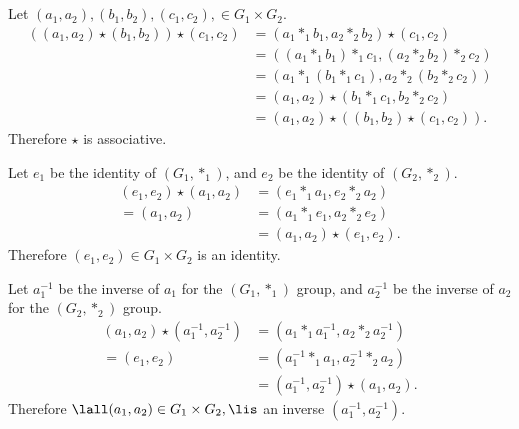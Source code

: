 \section{}
    \subsection{
        }

        Let $(a_1, a_2),(b_1, b_2),(c_1, c_2), \in G_1\times G_2$.
        \begin{align*}
            ((a_1, a_2) \star (b_1, b_2)) \star (c_1, c_2) 
            &= (a_1 *_1 b_1, a_2 *_2 b_2) \star (c_1, c_2) \\
            &= ((a_1 *_1 b_1) *_1 c_1, (a_2 *_2 b_2) *_2 c_2) \\
            &= (a_1 *_1 (b_1 *_1 c_1), a_2 *_2 (b_2 *_2 c_2)) \\
            &= (a_1, a_2) \star (b_1 *_1 c_1, b_2 *_2 c_2) \\
            &= (a_1, a_2) \star ((b_1, b_2) \star (c_1, c_2)).
        \end{align*}
        Therefore $\star$ is associative.

        Let $e_1$ be the identity of $(G_1, *_1)$,
        and $e_2$ be the identity of $(G_2, *_2)$.
        \begin{align*}
            (e_1, e_2) \star (a_1, a_2) 
            &= (e_1 *_1 a_1, e_2 *_2 a_2) \\
            = (a_1, a_2) 
            &= (a_1 *_1 e_1, a_2 *_2 e_2) \\
            &= (a_1, a_2) \star (e_1, e_2).
        \end{align*}
        Therefore $(e_1, e_2) \in G_1 \times G_2$ is an identity.

        Let $a_1^{-1}$ be the inverse of $a_1$ for the $(G_1, *_1)$ group,
        and $a_2^{-1}$ be the inverse of $a_2$ for the $(G_2, *_2)$ group.
        \begin{align*}
            (a_1, a_2) \star (a_1^{-1}, a_2^{-1}) 
            &= (a_1 *_1 a_1^{-1}, a_2 *_2 a_2^{-1}) \\
            = (e_1, e_2) 
            &= (a_1^{-1} *_1 a_1, a_2^{-1} *_2 a_2) \\
            &= (a_1^{-1}, a_2^{-1}) \star (a_1, a_2).
        \end{align*}
        Therefore $\lall (a_1,a_2) \in G_1 \times G_2, \lis$ an inverse $(a_1^{-1}, a_2^{-1})$.

